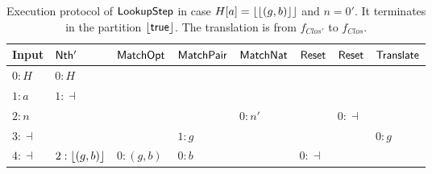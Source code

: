 \begin{table}[t]
  \centering
  \scriptsize
  \begin{tabular}{l||l|l|l|l|l|l|l}
    Input      & $\mathsf{Nth'}$      & $\mathsf{MatchOpt}$       & $\mathsf{MatchPair}$     & $\mathsf{MatchNat}$ & $\mathsf{Reset}$ & $\mathsf{Reset}$ & $\mathsf{Translate}$ \\ \hline
    $0:H$      & $0:H$            &                       &                      &                 &              &              &                  \\
    $1:a$      & $1:\dashv$       &                       &                      &                 &              &              &                  \\
    $2:n$      &                  &                       &                      & $0:n'$          &              & $0:\dashv$   &                  \\
    $3:\dashv$ &                  &                       & $1: g$               &                 &              &              & $0:g$            \\
    $4:\dashv$ & $2:\left\lfloor {(g,b)} \right\rfloor$ & $0:(g,b)$             & $0:b$                &                 & $0:\dashv$   &              &                  \\
  \end{tabular}
  \caption{Execution protocol of $\mathsf{LookupStep}$ in case $H[a] = \left\lfloor {\left\lfloor {(g,b)} \right\rfloor} \right\rfloor$ and $n=0'$.  It terminates in the partition $\left\lfloor {\ensuremath{\mathsf{true}}} \right\rfloor$.  The
    translation is from $f_{Clos'}$ to $f_{Clos}$.}
  \label{tab:exec-LookupStep-0}
\end{table}

